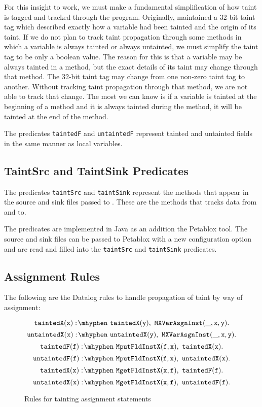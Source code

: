 For this insight to work, we must make a fundamental simplification of
how taint is tagged and tracked through the program. Originally,
\phosphor{} maintained a 32-bit taint tag which described exactly how
a variable had been tainted and the origin of its taint. If we do not
plan to track taint propagation through some methods in which a
variable is always tainted or always untainted, we must simplify the
taint tag to be only a boolean value. The reason for this is that a
variable may be always tainted in a method, but the exact details of
its taint may change through that method. The 32-bit taint tag may
change from one non-zero taint tag to another. Without tracking taint
propagation through that method, we are not able to track that
change. The most we can know is if a variable is tainted at the
beginning of a method and it is always tainted during the method, it
will be tainted at the end of the method.

The predicates \texttt{taintedF} and \texttt{untaintedF} represent
tainted and untainted fields in the same manner as local variables.
\subsection{TaintSrc and TaintSink Predicates}
The predicates \texttt{taintSrc} and \texttt{taintSink} represent the
methods that appear in the source and sink files passed to
\phosphor{}. These are the methods that \phosphor{} tracks data from
and to.

The predicates are implemented in Java as an addition the Petablox
tool. The source and sink files can be passed to Petablox with a new
configuration option and are read and filled into the
\texttt{taintSrc} and \texttt{taintSink} predicates.
\subsection{Assignment Rules}
The following are the Datalog rules to handle propagation of taint by
way of assignment:
\begin{figure}[H]
\begin{equation}
  \mathtt{taintedX(x) \is taintedX(y) \also MXVarAsgnInst(\_,x,y).}
\end{equation}
\begin{equation}
  \mathtt{untaintedX(x) \is untaintedX(y) \also
    MXVarAsgnInst(\_,x,y).}
\end{equation}
\begin{equation}
  \mathtt{taintedF(f) \is MputFldInstX(f,x) \also taintedX(x).}
\end{equation}
\begin{equation}
  \mathtt{untaintedF(f) \is MputFldInstX(f,x) \also untaintedX(x).}
\end{equation}
\begin{equation}
  \mathtt{taintedX(x) \is MgetFldInstX(x,f) \also taintedF(f).}
\end{equation}
\begin{equation}
  \mathtt{untaintedX(x) \is MgetFldInstX(x,f) \also untaintedF(f).}
\end{equation}
\caption{Rules for tainting assignment statements}\label{fig:asgn}
\end{figure}


